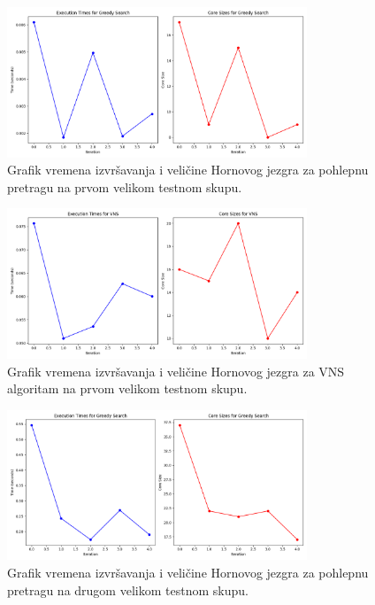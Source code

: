 \documentclass[12pt,oneside]{memoir}
\begin{document}
\begin{figure}[H]
    \centering
    \includegraphics[width=0.8\textwidth]{test1_greedy_performance.png}
    \caption{Grafik vremena izvršavanja i veličine Hornovog jezgra za pohlepnu pretragu na prvom velikom testnom skupu.}
    \label{fig:test1_greedy_performance}
\end{figure}

\begin{figure}[H]
    \centering
    \includegraphics[width=0.8\textwidth]{test1_vns_performance.png}
    \caption{Grafik vremena izvršavanja i veličine Hornovog jezgra za VNS algoritam na prvom velikom testnom skupu.}
    \label{fig:test1_vns_performance}
\end{figure}

\begin{figure}[H]
    \centering
    \includegraphics[width=0.8\textwidth]{test2_greedy_performance.png}
    \caption{Grafik vremena izvršavanja i veličine Hornovog jezgra za pohlepnu pretragu na drugom velikom testnom skupu.}
    \label{fig:test2_greedy_performance}
\end{figure}
\end{document}
